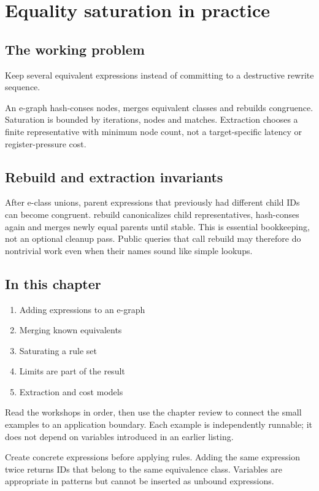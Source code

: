\chapter{Equality saturation in practice}\label{ch:9}
\section*{The working problem}
Keep several equivalent expressions instead of committing to a destructive rewrite sequence.

An e-graph hash-conses nodes, merges equivalent classes and rebuilds congruence. Saturation is bounded by iterations, nodes and matches. Extraction chooses a finite representative with minimum node count, not a target-specific latency or register-pressure cost.

\section*{Rebuild and extraction invariants}
After e-class unions, parent expressions that previously had different child IDs can become congruent. rebuild canonicalizes child representatives, hash-conses again and merges newly equal parents until stable. This is essential bookkeeping, not an optional cleanup pass. Public queries that call rebuild may therefore do nontrivial work even when their names sound like simple lookups.

\section*{In this chapter}
\begin{enumerate}
\item Adding expressions to an e-graph
\item Merging known equivalents
\item Saturating a rule set
\item Limits are part of the result
\item Extraction and cost models
\end{enumerate}
Read the workshops in order, then use the chapter review to connect the small examples to an application boundary. Each example is independently runnable; it does not depend on variables introduced in an earlier listing.

\clearpage
{}
Create concrete expressions before applying rules. Adding the same expression twice returns IDs that belong to the same equivalence class. Variables are appropriate in patterns but cannot be inserted as unbound expressions.

